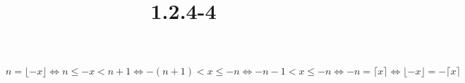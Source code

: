 \documentclass{article}
\title{1.2.4-4}
\begin{document}
\maketitle

$n = \lfloor -x \rfloor \iff n \leq -x < n + 1 \iff -(n+1) < x \leq -n \iff -n-1 < x \leq -n \iff -n = \lceil x \rceil \iff \lfloor -x \rfloor = - \lceil x \rceil$
\end{document}
